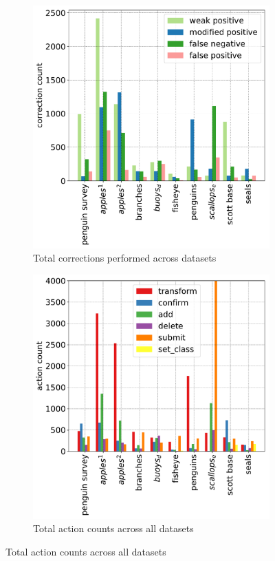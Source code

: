 \begin{figure}[H] 
\centering
\begin{subfigure}{0.48\linewidth}
\includegraphics[width=1.0\linewidth]{charts/summaries/correction_counts.pdf}
\caption{Total corrections performed across datasets}
\end{subfigure}%
\begin{subfigure}{0.48\linewidth}
\includegraphics[width=1.0\linewidth]{charts/summaries/action_counts.pdf}
\caption{Total action counts across all datasets}
\end{subfigure}

\label{fig:actions_dataset}
\end{figure}



